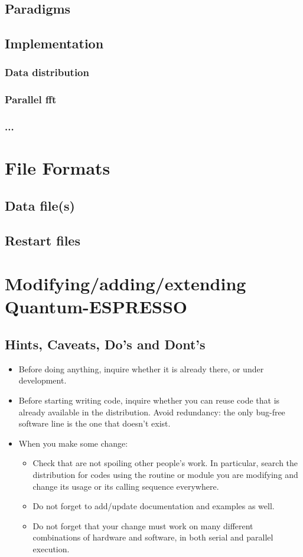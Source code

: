 \documentclass[12pt,a4paper]{article}
\begin{document}
\subsection{Paradigms}
\subsection{Implementation}
\subsubsection{Data distribution}
\subsubsection{Parallel fft}
\subsubsection{...}

\section{File Formats}
\subsection{Data file(s)}
\subsection{Restart files}

\section{Modifying/adding/extending Quantum-ESPRESSO}
\subsection{Hints, Caveats, Do's and Dont's}
\begin{itemize}
\item
Before doing anything, inquire whether it is already there,
or under development.
\item 
Before starting writing code, inquire whether you can reuse
code that is already available in the distribution. Avoid 
redundancy: the only bug-free software line is the one that 
doesn't exist.
\item When you make some change:
\begin{itemize}
\item Check that are not spoiling other people's work.
In particular, search the distribution for codes using the routine 
or module you are modifying and change its usage or its calling 
sequence everywhere.
\item Do not forget to add/update documentation and examples as well.
\item Do not forget that your change must work on many different 
combinations of hardware and software, in both serial and parallel
execution.
\end{itemize}
\end{itemize}
\end{document}
